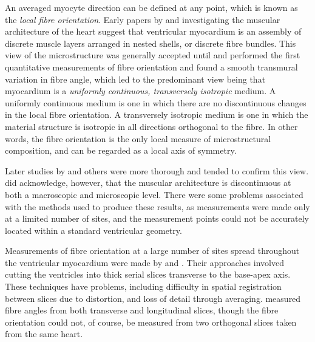 An averaged myocyte direction can be defined at any point, which is known as
the \emph{local fibre orientation}.  Early papers by
 and  investigating the 
muscular architecture of the
heart suggest that ventricular myocardium is an assembly of discrete muscle
layers arranged in nested shells, or discrete fibre
bundles\cite{legrice:1992}.  This view of the microstructure was generally
accepted until  and 
 performed the
first quantitative measurements of fibre orientation and found a smooth
transmural variation in fibre angle, which led to the predominant view being
that myocardium is a \emph{uniformly continuous, transversely isotropic}
medium.  A uniformly continuous medium is one in which there are no
discontinuous changes in the local fibre orientation.  A transversely isotropic
medium is one in which the material structure is isotropic in all directions
orthogonal to the fibre.  In other words, the fibre orientation is the only
local measure of microstructural composition, and can be regarded as a local
axis of symmetry.

Later studies by  and others were more thorough and
tended to confirm this view.   did acknowledge,
however, that the muscular architecture is discontinuous at both a macroscopic
and microscopic level.  There were some problems associated with the methods
used to produce these results, as measurements were made only at a limited
number of sites, and the measurement points could not be accurately located
within a standard ventricular geometry.

Measurements of fibre orientation at a large number of sites spread throughout
the ventricular myocardium were made by  and
.  Their approaches involved cutting the ventricles
into thick serial slices transverse to the base-apex axis.  These techniques
have problems, including difficulty in spatial registration between slices due
to distortion, and loss of detail through averaging.  
measured fibre angles from both transverse and longitudinal slices, though the
fibre orientation could not, of course, be measured from two orthogonal slices
taken from the same heart.

